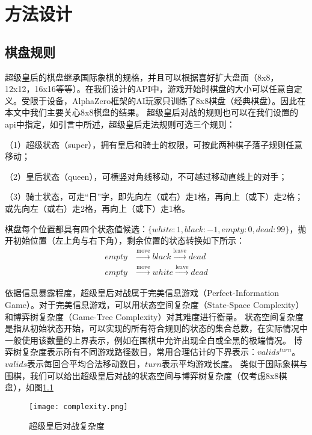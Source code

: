 \chapter{方法设计}
\label{chap:algorithm}

\section{棋盘规则}
超级皇后的棋盘继承国际象棋的规格，并且可以根据喜好扩大盘面（8x8，12x12，16x16等等）。在我们设计的API中，游戏开始时棋盘的大小可以任意自定义。受限于设备，AlphaZero框架的AI玩家只训练了8x8棋盘（经典棋盘）。因此在本文中我们主要关心8x8棋盘的结果。
超级皇后对战的规则也可以在我们设置的api中指定，如引言中所述，超级皇后走法规则可选三个规则：

（1）超级状态（super），拥有皇后和骑士的权限，可按此两种棋子落子规则任意移动；

（2）皇后状态（queen），可横竖对角线移动，不可越过移动直线上的对手；

（3）骑士状态，可走“日”字，即先向左（或右）走1格，再向上（或下）走2格；或先向左（或右）走2格，再向上（或下）走1格。

棋盘每个位置都具有四个状态值候选：$\{white:1, black:-1,empty:0,dead:99\}$，抛开初始位置（左上角与右下角），剩余位置的状态转换如下所示：
\begin{equation}
    \begin{aligned}
    empty &\stackrel{\mathrm{move}}{\longrightarrow} black \stackrel{\mathrm{leave}}{\longrightarrow} dead \\
    empty &\stackrel{\mathrm{move}}{\longrightarrow} white \stackrel{\mathrm{leave}}{\longrightarrow} dead 
    \end{aligned}
\end{equation}

依据信息暴露程度，超级皇后对战属于完美信息游戏（Perfect-Information Game）\cite{binmore2007game}。对于完美信息游戏，可以用状态空间复杂度（State-Space Complexity）和博弈树复杂度（Game-Tree Complexity）对其难度进行衡量\cite{allis1994searching,VANDENHERIK2002277}。
状态空间复杂度是指从初始状态开始，可以实现的所有符合规则的状态的集合总数，在实际情况中一般使用该数量的上界表示，例如在围棋中允许出现全白或全黑的极端情况。
博弈树复杂度表示所有不同游戏路径数目，常用合理估计的下界表示：$valids^{turn}$。 $valids$表示每回合平均合法移动数目，$turn$表示平均游戏长度。
类似于国际象棋与围棋，我们可以给出超级皇后对战的状态空间与博弈树复杂度（仅考虑8x8棋盘），如图\ref{fig:complexity}
\begin{figure}[htb]
    \centering
    \texttt{[image: complexity.png]}
    \caption[complexity]{%
        超级皇后对战复杂度\cite{enwiki:complexity}%
      }
    \label{fig:complexity}
\end{figure}


